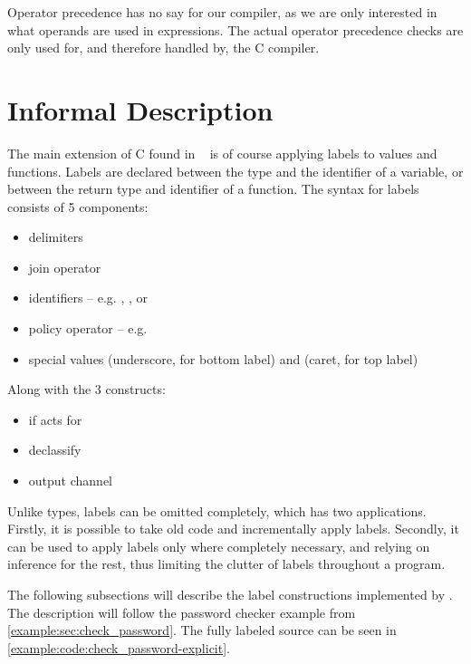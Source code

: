 Operator precedence has no say for our compiler, as we are only interested in what operands are used in expressions.
The actual operator precedence checks are only used for, and therefore handled by, the C compiler.

\section{Informal Description}
The main extension of C found in \thelang~ is of course applying labels to values and functions.
Labels are declared between the type and the identifier of a variable, or between the return type and identifier of a function.
The syntax for labels consists of 5 components:
\begin{itemize}
  \item delimiters \dlmc{\{\{ \}\}}
  \item join operator \dlmc{;}
  \item identifiers -- e.g. , , or 
  \item policy operator \dlmc{->} -- e.g. 
  \item special values \dlmc{_} (underscore, for bottom label) and \dlmc{^} (caret, for top label)
\end{itemize}

Along with the 3 constructs:
\begin{itemize}
  \item if acts for 
  \item declassify 
  \item output channel 
\end{itemize}

Unlike types, labels can be omitted completely, which has two applications.
Firstly, it is possible to take old code and incrementally apply labels.
Secondly, it can be used to apply labels only where completely necessary, and relying on inference for the rest, thus limiting the clutter of labels throughout a program.

The following subsections will describe the label constructions implemented by \thelang.
The description will follow the password checker example from \cref{example:sec:check_password}.
The fully labeled source can be seen in \cref{example:code:check_password-explicit}.



